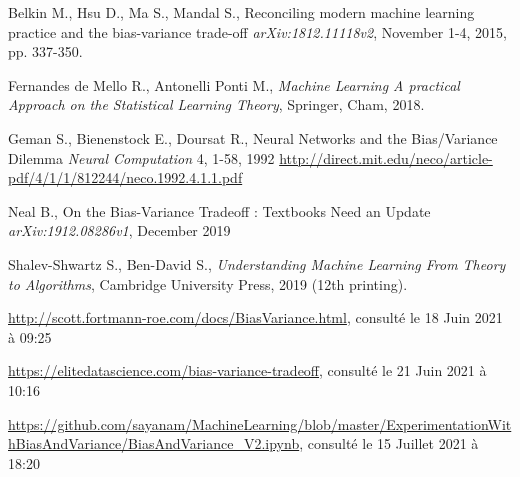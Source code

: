 \documentclass[a4paper]{article}
\begin{document}
\begin{thebibliography}{9}
	
	Belkin M., Hsu D., Ma S., Mandal S.,
	Reconciling modern machine learning practice and the bias-variance trade-off
	\textit{arXiv:1812.11118v2}, November 1-4, 2015, pp. 337-350.
	
	Fernandes de Mello R., Antonelli Ponti M.,
	\textit{Machine Learning A practical Approach on the Statistical Learning Theory},
	Springer, Cham, 2018.
	
	Geman S., Bienenstock E., Doursat R.,
	Neural Networks and the Bias/Variance Dilemma
	\textit{Neural Computation} 4, 1-58, 1992
	\url{http://direct.mit.edu/neco/article-pdf/4/1/1/812244/neco.1992.4.1.1.pdf}
	
	Neal B.,
	On the Bias-Variance Tradeoff : Textbooks Need an Update
	\textit{arXiv:1912.08286v1}, December 2019
	
	Shalev-Shwartz S., Ben-David S.,
	\textit{Understanding Machine Learning From Theory to Algorithms},
	Cambridge University Press, 2019 (12th printing).
	
	\url{http://scott.fortmann-roe.com/docs/BiasVariance.html},
	consulté le 18 Juin 2021 à 09:25
	
	\url{https://elitedatascience.com/bias-variance-tradeoff},
	consulté le 21 Juin 2021 à 10:16
	
	\url{https://github.com/sayanam/MachineLearning/blob/master/ExperimentationWithBiasAndVariance/BiasAndVariance_V2.ipynb},
	consulté le 15 Juillet 2021 à 18:20
	
	
\end{thebibliography}
\newpage

\listoffigures
\newpage
\end{document}
